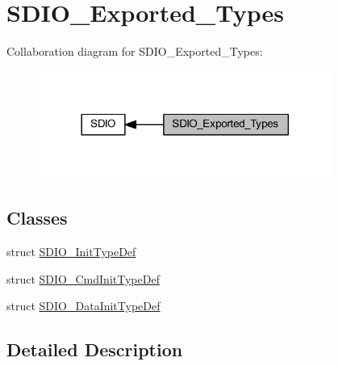 \hypertarget{group___s_d_i_o___exported___types}{}\section{S\+D\+I\+O\+\_\+\+Exported\+\_\+\+Types}
\label{group___s_d_i_o___exported___types}
Collaboration diagram for S\+D\+I\+O\+\_\+\+Exported\+\_\+\+Types\+:
\nopagebreak
\begin{figure}[H]
\begin{center}
\leavevmode
\includegraphics[width=272pt]{group___s_d_i_o___exported___types}
\end{center}
\end{figure}
\subsection*{Classes}
\begin{DoxyCompactItemize}
\item 
struct \hyperlink{struct_s_d_i_o___init_type_def}{S\+D\+I\+O\+\_\+\+Init\+Type\+Def}
\item 
struct \hyperlink{struct_s_d_i_o___cmd_init_type_def}{S\+D\+I\+O\+\_\+\+Cmd\+Init\+Type\+Def}
\item 
struct \hyperlink{struct_s_d_i_o___data_init_type_def}{S\+D\+I\+O\+\_\+\+Data\+Init\+Type\+Def}
\end{DoxyCompactItemize}


\subsection{Detailed Description}
